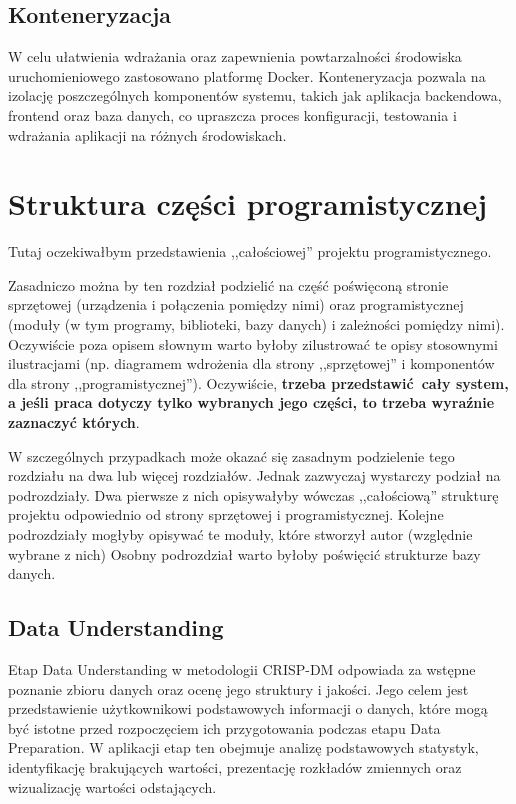 \documentclass[12pt]{book}
\begin{document}
\section{Konteneryzacja}

W celu ułatwienia wdrażania oraz zapewnienia powtarzalności środowiska uruchomieniowego zastosowano platformę Docker. 
Konteneryzacja pozwala na izolację poszczególnych komponentów systemu, takich jak aplikacja backendowa, frontend oraz baza danych,
co upraszcza proces konfiguracji, testowania i wdrażania aplikacji na różnych środowiskach.

\chapter{Struktura części programistycznej}

Tutaj oczekiwałbym przedstawienia
,,całościowej''
projektu programistycznego.

Zasadniczo można by ten rozdział podzielić
na część poświęconą stronie sprzętowej
(urządzenia i połączenia pomiędzy nimi)
oraz programistycznej
(moduły (w tym programy, biblioteki, bazy danych)
i zależności pomiędzy nimi).
Oczywiście poza opisem słownym warto byłoby 
zilustrować te opisy stosownymi ilustracjami
(np. diagramem wdrożenia dla strony ,,sprzętowej''
i komponentów dla strony ,,programistycznej'').
Oczywiście, \textbf{trzeba przedstawić cały system,
a jeśli praca dotyczy tylko wybranych jego
części, to trzeba wyraźnie zaznaczyć których}.

W szczególnych przypadkach może okazać się
zasadnym podzielenie tego rozdziału na dwa
lub więcej rozdziałów.
Jednak zazwyczaj wystarczy 
podział na podrozdziały. 
Dwa pierwsze z nich opisywałyby wówczas
,,całościową'' strukturę projektu
odpowiednio od strony sprzętowej
i programistycznej.
Kolejne podrozdziały mogłyby opisywać
te moduły, które stworzył autor
(względnie wybrane z nich) 
Osobny podrozdział warto byłoby poświęcić
strukturze bazy danych.

\section{Data Understanding}

Etap Data Understanding w metodologii CRISP-DM odpowiada za
wstępne poznanie zbioru danych oraz ocenę jego struktury i jakości.
Jego celem jest przedstawienie użytkownikowi podstawowych informacji o danych,
które mogą być istotne przed rozpoczęciem ich przygotowania
podczas etapu Data Preparation. W aplikacji etap ten obejmuje analizę
podstawowych statystyk, identyfikację brakujących wartości,
prezentację rozkładów zmiennych oraz wizualizację wartości
odstających.
\end{document}
